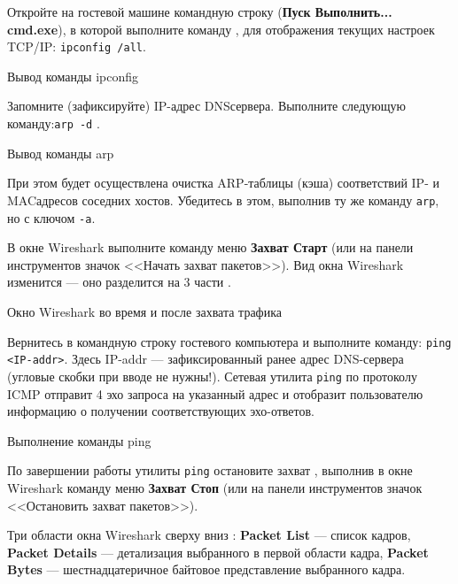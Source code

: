 Откройте на гостевой машине командную строку
(\textbf{Пуск \rarrow Выполнить... \rarrow cmd.exe}),
в которой выполните команду ,
для отображения текущих настроек TCP/IP: \texttt{ipconfig /all}.

\begin{image}
	\caption{Вывод команды ipconfig}
	\label{fig:wnd:ipconfig}
\end{image}

Запомните (зафиксируйте) IP-адрес DNSсервера.
Выполните следующую команду:\texttt{arp -d} .

\begin{image}
	\caption{Вывод команды arp}
	\label{fig:wnd:arp}
\end{image}

При этом будет осуществлена очистка ARP-таблицы (кэша)
соответствий IP- и MACадресов соседних хостов.
Убедитесь в этом, выполнив ту же команду \texttt{arp}, но с ключом \texttt{-a}.

В окне Wireshark выполните команду меню \textbf{Захват \rarrow Старт}
(или на панели инструментов значок <<Начать захват пакетов>>).
Вид окна Wireshark изменится --- оно разделится на 3 части
.

\begin{image}
	\caption{Окно Wireshark во время и после захвата трафика}
	\label{fig:wrsh:trafic}
\end{image}

Вернитесь в командную строку гостевого компьютера
и выполните команду: \texttt{ping <IP-addr>}.
Здесь IP-addr --- зафиксированный ранее адрес DNS-сервера
(угловые скобки при вводе не нужны!).
Сетевая утилита \texttt{ping}
по протоколу ICMP отправит 4 эхо запроса на указанный адрес
и отобразит пользователю информацию о получении соответствующих эхо-ответов.

\begin{image}
	\caption{Выполнение команды ping}
	\label{fig:wnd:ping}
\end{image}


По завершении работы утилиты \texttt{ping}
остановите захват ,
выполнив в окне Wireshark команду меню \textbf{Захват \rarrow Стоп}
(или на панели инструментов значок <<Остановить захват пакетов>>).

Три области окна Wireshark сверху вниз :
\textbf{Packet List} --- список кадров,
\textbf{Packet Details} --- детализация выбранного в первой области кадра,
\textbf{Packet Bytes} --- шестнадцатеричное байтовое представление
выбранного кадра.

